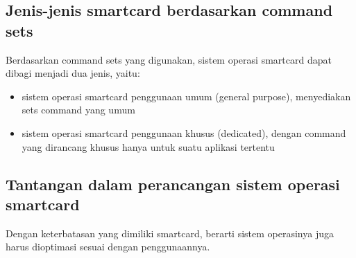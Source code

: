 \documentclass[a4paper, 12pt]{report}
\begin{document}
\subsection{Jenis-jenis smartcard berdasarkan command sets}

Berdasarkan command sets yang digunakan, sistem operasi smartcard dapat dibagi menjadi dua jenis, yaitu:

\begin{itemize}
\item sistem operasi smartcard penggunaan umum (general purpose), menyediakan sets command yang umum
\item sistem operasi smartcard penggunaan khusus (dedicated), dengan command yang dirancang khusus hanya untuk suatu aplikasi tertentu
\end{itemize}

\subsection{Tantangan dalam perancangan sistem operasi smartcard}

Dengan keterbatasan yang dimiliki smartcard, berarti sistem operasinya juga harus dioptimasi sesuai dengan penggunaannya. 
\end{document}
